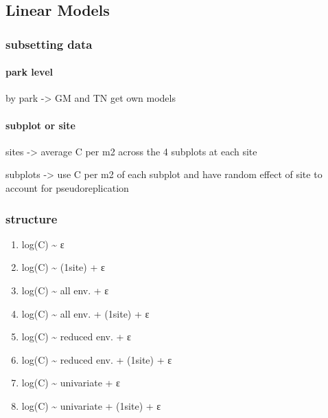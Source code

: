 \documentclass[
  letterpaper,
  DIV=11,
  numbers=noendperiod]{scrartcl}
\let\oldparagraph\paragraph
\renewcommand{\paragraph}[1]{\oldparagraph{#1}\mbox{}}
\begin{document}
\hypertarget{linear-models}{%
\subsection{Linear Models}\label{linear-models}}

\hypertarget{subsetting-data}{%
\subsubsection{subsetting data}\label{subsetting-data}}

\hypertarget{park-level}{%
\paragraph{park level}\label{park-level}}

by park -\textgreater{} GM and TN get own models

\hypertarget{subplot-or-site}{%
\paragraph{subplot or site}\label{subplot-or-site}}

sites -\textgreater{} average C per m2 across the 4 subplots at each
site

subplots -\textgreater{} use C per m2 of each subplot and have random
effect of site to account for pseudoreplication

\hypertarget{structure}{%
\subsubsection{structure}\label{structure}}

\begin{enumerate}
\def\labelenumi{\roman{enumi}.}
\item
  log(C) \textasciitilde{} ε
\item
  log(C) \textasciitilde{} (1\textbar site) + ε
\item
  log(C) \textasciitilde{} all env. + ε
\item
  log(C) \textasciitilde{} all env. + (1\textbar site) + ε
\item
  log(C) \textasciitilde{} reduced env. + ε
\item
  log(C) \textasciitilde{} reduced env. + (1\textbar site) + ε
\item
  log(C) \textasciitilde{} univariate + ε
\item
  log(C) \textasciitilde{} univariate + (1\textbar site) + ε
\end{enumerate}

\hypertarget{section}{%
\subsection{}\label{section}}
\end{document}
